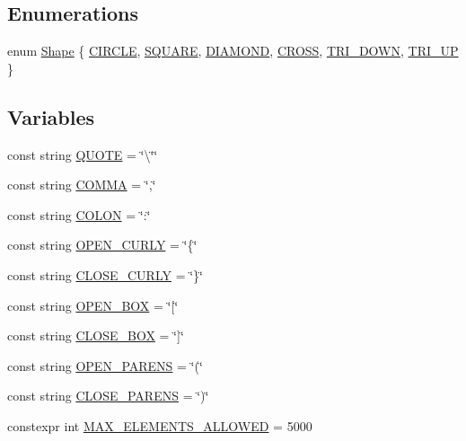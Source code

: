\subsection*{Enumerations}
\begin{DoxyCompactItemize}
\item 
enum \hyperlink{namespacebridges_a1b4050586bd708782ae0d4f3b06b9579}{Shape} \{ \newline
\hyperlink{namespacebridges_a1b4050586bd708782ae0d4f3b06b9579aa968bf0f7aeccbae1a40751345bf2e64}{C\+I\+R\+C\+LE}, 
\hyperlink{namespacebridges_a1b4050586bd708782ae0d4f3b06b9579a4fc84095f1e7f3e664913b93050196e2}{S\+Q\+U\+A\+RE}, 
\hyperlink{namespacebridges_a1b4050586bd708782ae0d4f3b06b9579aefd26c044477c7b165bc744110e0ee93}{D\+I\+A\+M\+O\+ND}, 
\hyperlink{namespacebridges_a1b4050586bd708782ae0d4f3b06b9579abe7bf91f3fc0356925109d7afdd43135}{C\+R\+O\+SS}, 
\newline
\hyperlink{namespacebridges_a1b4050586bd708782ae0d4f3b06b9579af9a87963ef14566f72813a071197c862}{T\+R\+I\+\_\+\+D\+O\+WN}, 
\hyperlink{namespacebridges_a1b4050586bd708782ae0d4f3b06b9579a8398d7a1be69eeabd701010f70c4b769}{T\+R\+I\+\_\+\+UP}
 \}
\end{DoxyCompactItemize}
\subsection*{Variables}
\begin{DoxyCompactItemize}
\item 
const string \hyperlink{namespacebridges_acd8357e88562cbb7e60bea3fac422ac3}{Q\+U\+O\+TE} = \char`\"{}\textbackslash{}\char`\"{}\char`\"{}
\item 
const string \hyperlink{namespacebridges_a74087afbaa635d3c3d837cc3b44c0162}{C\+O\+M\+MA} = \char`\"{},\char`\"{}
\item 
const string \hyperlink{namespacebridges_a039dca813ca3a9b4c8d8a866c6fa8445}{C\+O\+L\+ON} = \char`\"{}\+:\char`\"{}
\item 
const string \hyperlink{namespacebridges_a9bef552535e3f5bbfc2ca586cb5044c6}{O\+P\+E\+N\+\_\+\+C\+U\+R\+LY} = \char`\"{}\{\char`\"{}
\item 
const string \hyperlink{namespacebridges_aa0d8f65415cfe7cdca23401137d40ca9}{C\+L\+O\+S\+E\+\_\+\+C\+U\+R\+LY} = \char`\"{}\}\char`\"{}
\item 
const string \hyperlink{namespacebridges_a6b481335016325fe202a4e2fedd0af14}{O\+P\+E\+N\+\_\+\+B\+OX} = \char`\"{}\mbox{[}\char`\"{}
\item 
const string \hyperlink{namespacebridges_a9cbd20a3f223f32670280b954061f274}{C\+L\+O\+S\+E\+\_\+\+B\+OX} = \char`\"{}\mbox{]}\char`\"{}
\item 
const string \hyperlink{namespacebridges_ad909fb43b05ef6b7271fddbe85e2742a}{O\+P\+E\+N\+\_\+\+P\+A\+R\+E\+NS} = \char`\"{}(\char`\"{}
\item 
const string \hyperlink{namespacebridges_aff509a0d23b28c17004b1efd5a0a5920}{C\+L\+O\+S\+E\+\_\+\+P\+A\+R\+E\+NS} = \char`\"{})\char`\"{}
\item 
constexpr int \hyperlink{namespacebridges_adc32aeee3ab880d297758a6d6200188f}{M\+A\+X\+\_\+\+E\+L\+E\+M\+E\+N\+T\+S\+\_\+\+A\+L\+L\+O\+W\+ED} = 5000
\end{DoxyCompactItemize}



